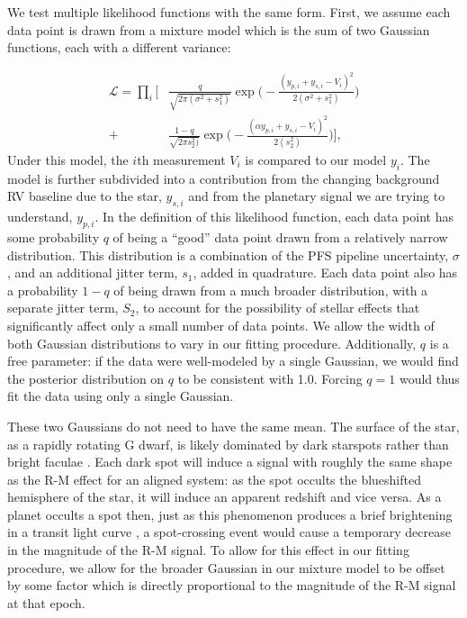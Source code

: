 \documentclass[twocolumn]{aastex63}
\begin{document}
We test multiple likelihood functions with the same form.
First, we assume each data point is drawn from a mixture model which is the sum of two Gaussian functions, each with a different variance:

\begin{equation}
\begin{split}
\mathcal{L} = \prod_i \bigg[ & \frac{q}{\sqrt{2\pi (\sigma^2 + s_1^2)}} \exp\bigg(-\frac{(y_{p,i} + y_{s,i}-V_i)^2}{2(\sigma^2 + s_1^2)}\bigg)  \\+ & \frac{1-q}{\sqrt{2\pi s_2^2)}} \exp\bigg(-\frac{(\alpha y_{p,i} + y_{s,i}-V_i)^2}{2(s_2^2)}\bigg) \bigg],
\end{split}
\end{equation}
Under this model, the $i$th measurement $V_i$ is compared to our model $y_i$. The model is further subdivided into a contribution from the changing background RV baseline due to the star, $y_{s,i}$ and from the planetary signal we are trying to understand, $y_{p,i}$. In the definition of this likelihood function, each data point has some probability $q$ of being a ``good'' data point drawn from a relatively narrow distribution. This distribution is a combination of the PFS pipeline uncertainty, $\sigma$, and an additional jitter term, $s_1$, added in quadrature. 
Each data point also has a probability $1-q$ of being drawn from a much broader distribution, with a separate jitter term, $S_2$, to account for the possibility of stellar effects that significantly affect only a small number of data points. We allow the width of both Gaussian distributions to vary in our fitting procedure. 
Additionally, $q$ is a free parameter: if the data were well-modeled by a single Gaussian, we would find the posterior distribution on $q$ to be consistent with 1.0.
Forcing $q=1$ would thus fit the data using only a single Gaussian.

These two Gaussians do not need to have the same mean. 
The surface of the star, as a rapidly rotating G dwarf, is likely dominated by dark starspots rather than bright faculae \citep{Montet17}. 
Each dark spot will induce a signal with roughly the same shape as the R-M effect for an aligned system: as the spot occults the blueshifted hemisphere of the star, it will induce an apparent redshift and vice versa.
As a planet occults a spot then, just as this phenomenon produces a brief brightening in a transit light curve \citep{Desert11, SanchisOjeda13, Morris17}, a spot-crossing event would cause a temporary decrease in the magnitude of the R-M signal. 
To allow for this effect in our fitting procedure, we allow for the broader Gaussian in our mixture model to be offset by some factor which is directly proportional to the magnitude of the R-M signal at that epoch. 
\end{document}
